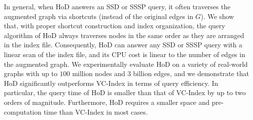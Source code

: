 \documentclass{sig-alternate}
\def\vgap{\vspace{0mm}}
\begin{document}
\begin{sloppy}
\vgap

In general, when HoD answers an SSD or SSSP query, it often traverses the augmented graph via shortcuts (instead of the original edges in $G$). We show that, with proper shortcut construction and index organization, the query algorithm of HoD always traverses nodes in the same order as they are arranged in the index file. Consequently, HoD can answer any SSD or SSSP query with a linear scan of the index file, and its CPU cost is linear to the number of edges in the augmented graph. %
We experimentally evaluate HoD on a variety of real-world graphs with up to $100$ million nodes and $3$ billion edges, and we demonstrate that HoD significantly outperforms VC-Index in terms of query efficiency. In particular, the query time of HoD is smaller than that of VC-Index by up to two orders of magnitude. Furthermore, HoD requires a smaller space and pre-computation time than VC-Index in most cases.

\vgap




%
%
%
%
%





\end{sloppy}
\end{document}
